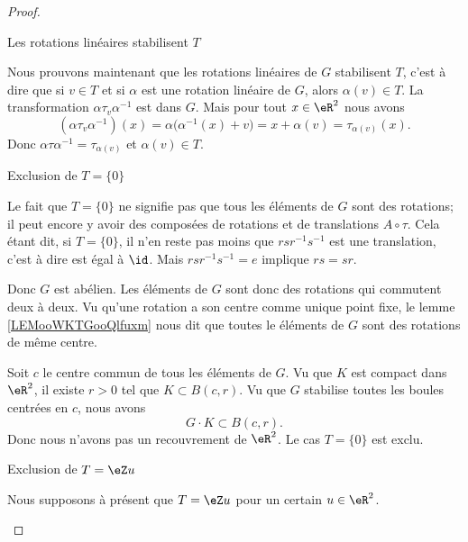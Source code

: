 \begin{proof}
\begin{subproof}
        \item[Les rotations linéaires stabilisent \( T\)]

            Nous prouvons maintenant que les rotations linéaires de \( G\) stabilisent \( T\), c'est à dire que si \( v\in T\) et si \( \alpha\) est une rotation linéaire de \( G\), alors \( \alpha(v)\in T\). La transformation \( \alpha\tau_v\alpha^{-1}\) est dans \( G\). Mais pour tout \( x\in \eR^2\) nous avons
            \begin{equation}
                (\alpha\tau_v\alpha^{-1})(x)=\alpha\big( \alpha^{-1}(x)+v \big)=x+\alpha(v)=\tau_{\alpha(v)}(x).
            \end{equation}
            Donc \( \alpha\tau\alpha^{-1}=\tau_{\alpha(v)}\) et \( \alpha(v)\in T\).
            
        \item[Exclusion de \( T=\{ 0 \}\)]

            Le fait que \( T=\{ 0 \}\) ne signifie pas que tous les éléments de \( G\) sont des rotations; il peut encore y avoir des composées de rotations et de translations \( A\circ \tau\). Cela étant dit, si \( T=\{ 0 \}\), il n'en reste pas moins que \( rsr^{-1}s^{-1}\) est une translation, c'est à dire est égal à \( \id\). Mais \( rsr^{-1}s^{-1}=e\) implique \( rs=sr\).

            Donc \( G\) est abélien. Les éléments de \( G\) sont donc des rotations qui commutent deux à deux. Vu qu'une rotation a son centre comme unique point fixe, le lemme \ref{LEMooWKTGooQlfuxm} nous dit que toutes le éléments de \( G\) sont des rotations de même centre.

            Soit \( c\) le centre commun de tous les éléments de \( G\). Vu que \( K\) est compact dans \( \eR^2\), il existe \( r>0\) tel que \( K\subset B(c,r)\). Vu que \( G\) stabilise toutes les boules centrées en \( c\), nous avons
            \begin{equation}
                G\cdot K\subset B(c,r).
            \end{equation}
            Donc nous n'avons pas un recouvrement de \( \eR^2\). Le cas \( T=\{0  \}\) est exclu.

        \item[Exclusion de \( T=\eZ u\)]

            Nous supposons à présent que \( T=\eZ u\) pour un certain \( u\in \eR^2\). 


\end{subproof}
\end{proof}
